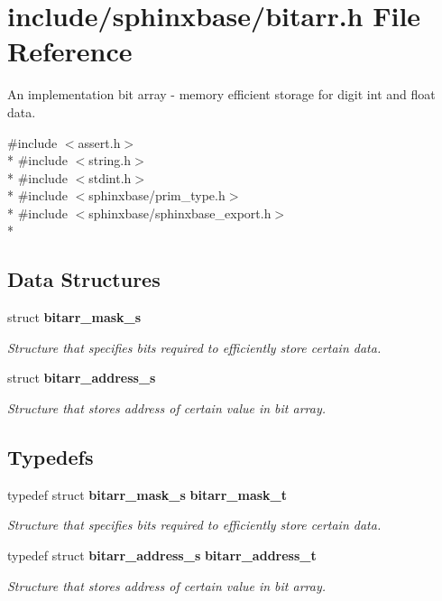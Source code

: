 \section{include/sphinxbase/bitarr.h File Reference}
\label{bitarr_8h}


An implementation bit array -\/ memory efficient storage for digit int and float data.  


{\ttfamily \#include $<$assert.\-h$>$}\\*
{\ttfamily \#include $<$string.\-h$>$}\\*
{\ttfamily \#include $<$stdint.\-h$>$}\\*
{\ttfamily \#include $<$sphinxbase/prim\-\_\-type.\-h$>$}\\*
{\ttfamily \#include $<$sphinxbase/sphinxbase\-\_\-export.\-h$>$}\\*
\subsection*{Data Structures}
\begin{DoxyCompactItemize}
\item 
struct {\bf bitarr\-\_\-mask\-\_\-s}
\begin{DoxyCompactList}\small\item\em Structure that specifies bits required to efficiently store certain data. \end{DoxyCompactList}\item 
struct {\bf bitarr\-\_\-address\-\_\-s}
\begin{DoxyCompactList}\small\item\em Structure that stores address of certain value in bit array. \end{DoxyCompactList}\end{DoxyCompactItemize}
\subsection*{Typedefs}
\begin{DoxyCompactItemize}
\item 
typedef struct {\bf bitarr\-\_\-mask\-\_\-s} {\bf bitarr\-\_\-mask\-\_\-t}\label{bitarr_8h_abcb7d3674c4b4bbed7af00ddfc07a11f}

\begin{DoxyCompactList}\small\item\em Structure that specifies bits required to efficiently store certain data. \end{DoxyCompactList}\item 
typedef struct {\bf bitarr\-\_\-address\-\_\-s} {\bf bitarr\-\_\-address\-\_\-t}\label{bitarr_8h_a0ec20752a791dac325045da770b3510d}

\begin{DoxyCompactList}\small\item\em Structure that stores address of certain value in bit array. \end{DoxyCompactList}\end{DoxyCompactItemize}
